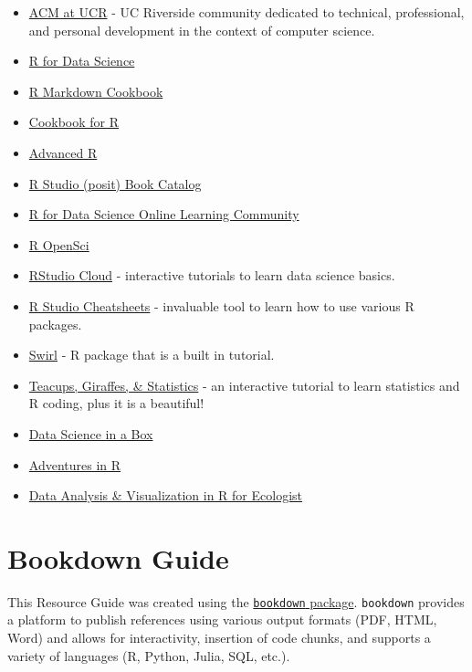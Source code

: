 \documentclass[
]{book}
\providecommand{\tightlist}{%
  \setlength{\itemsep}{0pt}\setlength{\parskip}{0pt}}
\begin{document}
\begin{itemize}
\tightlist
\item
  \href{https://acmucr.org/index.html}{ACM at UCR} - UC Riverside community dedicated to technical, professional, and personal development in the context of computer science.
\item
  \href{https://r4ds.had.co.nz/}{R for Data Science}
\item
  \href{https://bookdown.org/yihui/rmarkdown-cookbook/}{R Markdown Cookbook}
\item
  \href{http://www.cookbook-r.com/}{Cookbook for R}
\item
  \href{https://adv-r.hadley.nz/}{Advanced R}
\item
  \href{https://www.rstudio.com/resources/books/}{R Studio (posit) Book Catalog}
\item
  \href{https://www.rfordatasci.com/}{R for Data Science Online Learning Community}
\item
  \href{https://ropensci.org/}{R OpenSci}
\item
  \href{https://rstudio.cloud/learn/primers}{RStudio Cloud} - interactive tutorials to learn data science basics.
\item
  \href{https://www.rstudio.com/resources/cheatsheets/}{R Studio Cheatsheets} - invaluable tool to learn how to use various R packages.
\item
  \href{https://swirlstats.com/}{Swirl} - R package that is a built in tutorial.
\item
  \href{https://tinystats.github.io/teacups-giraffes-and-statistics/index.html}{Teacups, Giraffes, \& Statistics} - an interactive tutorial to learn statistics and R coding, plus it is a beautiful!
\item
  \href{https://datasciencebox.org/}{Data Science in a Box}
\item
  \href{https://www.adventures-in-r.com/}{Adventures in R}
\item
  \href{https://datacarpentry.org/R-ecology-lesson/}{Data Analysis \& Visualization in R for Ecologist}
\end{itemize}

\hypertarget{bookdown}{%
\chapter{Bookdown Guide}\label{bookdown}}

This Resource Guide was created using the \href{https://github.com/rstudio/bookdown}{\texttt{bookdown} package}. \texttt{bookdown} provides a platform to publish references using various output formats (PDF, HTML, Word) and allows for interactivity, insertion of code chunks, and supports a variety of languages (R, Python, Julia, SQL, etc.).
\end{document}
